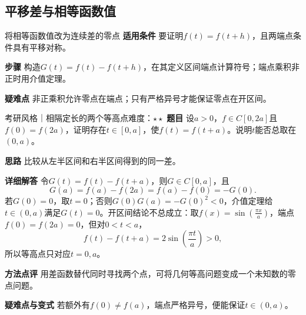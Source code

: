 \subsection{平移差与相等函数值}
\begin{method}{将相等函数值改为连续差的零点}
\textbf{适用条件} 要证明$f(t)=f(t+h)$，且两端点条件具有平移对称。\par
\textbf{步骤} 构造$G(t)=f(t)-f(t+h)$，在其定义区间端点计算符号；端点乘积非正时用介值定理。\par
\textbf{疑难点} 非正乘积允许零点在端点；只有严格异号才能保证零点在开区间。
\end{method}
\begin{example}{考研风格｜相隔定长的两个等高点}{难度：$\star\star$}\label{cd:ex:translate}
\textbf{题目} 设$a>0$，$f\in C[0,2a]$且$f(0)=f(2a)$，证明存在$t\in[0,a]$，使$f(t)=f(t+a)$。说明$t$能否总取在$(0,a)$。\par
\textbf{思路} 比较从左半区间和右半区间得到的同一差。\par
\textbf{详细解答} 令$G(t)=f(t)-f(t+a)$，则$G\in C[0,a]$，且
\[
 G(a)=f(a)-f(2a)=f(a)-f(0)=-G(0).
\]
若$G(0)=0$，取$t=0$；否则$G(0)G(a)=-G(0)^2<0$，介值定理给$t\in(0,a)$满足$G(t)=0$。开区间结论不总成立：取$f(x)=\sin(\frac{\pi x}{a})$，端点$f(0)=f(2a)=0$，但对$0<t<a$，
\[
 f(t)-f(t+a)=2\sin(\dfrac{\pi t}{a})>0,
\]
所以等高点只对应$t=0,a$。\par
\textbf{方法点评} 用差函数替代同时寻找两个点，可将几何等高问题变成一个未知数的零点问题。\par
\textbf{疑难点与变式} 若额外有$f(0)\ne f(a)$，端点严格异号，便能保证$t\in(0,a)$。
\end{example}

